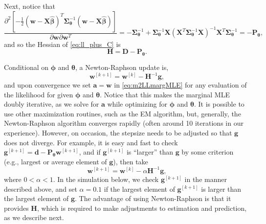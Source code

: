\documentclass[12pt, titlepage]{article}
\begin{document}
Next, notice that
$$
\frac{\partial^2 [-\frac{1}{2}(\mathbf{w} - \mathbf{X}\hat{\boldsymbol{\beta}})^{T}\boldsymbol{\Sigma}_{\boldsymbol{\theta}}^{-1}(\mathbf{w} - \mathbf{X}\hat{\boldsymbol{\beta}})] }{\partial \mathbf{w} \partial \mathbf{w}^{T}} =
	-\boldsymbol{\Sigma}_{\boldsymbol{\theta}}^{-1} + \boldsymbol{\Sigma}_{\boldsymbol{\theta}}^{-1}\mathbf{X}(\mathbf{X}^{T}\boldsymbol{\Sigma}_{\boldsymbol{\theta}}^{-1}\mathbf{X})^{-1}\mathbf{X}^{T}\boldsymbol{\Sigma}_{\boldsymbol{\theta}}^{-1} = -\mathbf{P}_{\boldsymbol{\theta}},
$$
and so the Hessian of \eqref{eq:ll_plus_C} is
\begin{equation} \label{eq:Hdef}
\mathbf{H} = \mathbf{D} -\mathbf{P}_{\boldsymbol{\theta}}.
\end{equation}

Conditional on $\boldsymbol{\phi}$ and $\boldsymbol{\theta}$, a Newton-Raphson update is,
\[
\mathbf{w}^{[k+1]} = \mathbf{w}^{[k]} - \mathbf{H}^{-1}\mathbf{g},
\]
and upon convergence we set $\mathbf{a} = \mathbf{w}$ in \eqref{eq:m2LLmargMLE} for any evaluation of the likelihood for given $\boldsymbol{\phi}$ and $\boldsymbol{\theta}$.  Notice that this makes the marginal MLE doubly iterative, as we solve for $\mathbf{a}$ while optimizing for $\boldsymbol{\phi}$ and $\boldsymbol{\theta}$. It is possible to use other maximization routines, such as the EM algorithm, but, generally, the Newton-Raphson algorithm converges rapidly (often around 10 iterations in our experience).  However, on occasion, the stepsize needs to be adjusted so that $\mathbf{g}$ does not diverge.  For example, it is easy and fast to check $\mathbf{g}^{[k + 1]} = \mathbf{d} - \mathbf{P}_{\boldsymbol{\theta}}\mathbf{w}^{[k+1]}$, and if $\mathbf{g}^{[k + 1]}$ is ``larger'' than $\mathbf{g}$ by some criterion (e.g., largest or average element of $\mathbf{g}$), then take
\[
\mathbf{w}^{[k+1]} = \mathbf{w}^{[k]} - \alpha\mathbf{H}^{-1}\mathbf{g},
\]
where $0 < \alpha < 1$.  In the simulation below, we check $\mathbf{g}^{[k + 1]}$ in the manner described above, and set $\alpha =0.1$ if the largest element of $\mathbf{g}^{[k + 1]}$ is larger than the largest element of $\mathbf{g}$.  The advantage of using Newton-Raphson is that it provides $\mathbf{H}$, which is required to make adjustments to estimation and prediction, as we describe next.


\end{document}
